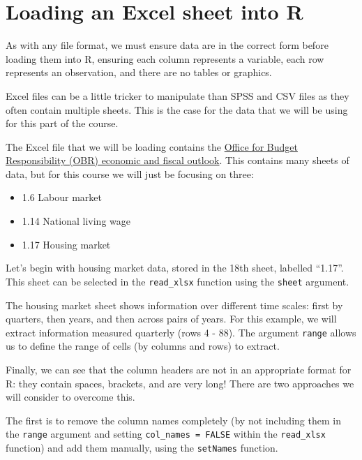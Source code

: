 \documentclass[
  letterpaper,
  DIV=11,
  numbers=noendperiod]{scrreprt}
\providecommand{\tightlist}{%
  \setlength{\itemsep}{0pt}\setlength{\parskip}{0pt}}\usepackage{longtable,booktabs,array}
\begin{document}
\section{Loading an Excel sheet into
R}\label{loading-an-excel-sheet-into-r}

As with any file format, we must ensure data are in the correct form
before loading them into R, ensuring each column represents a variable,
each row represents an observation, and there are no tables or graphics.

Excel files can be a little tricker to manipulate than SPSS and CSV
files as they often contain multiple sheets. This is the case for the
data that we will be using for this part of the course.

The Excel file that we will be loading contains the
\href{https://view.officeapps.live.com/op/view.aspx?src=https\%3A\%2F\%2Fobr.uk\%2Fdocs\%2Fdlm_uploads\%2FDetailed_forecast_tables_Economy_March_2024.xlsx&wdOrigin=BROWSELINK}{Office
for Budget Responsibility (OBR) economic and fiscal outlook}. This
contains many sheets of data, but for this course we will just be
focusing on three:

\begin{itemize}
\tightlist
\item
  1.6 Labour market
\item
  1.14 National living wage
\item
  1.17 Housing market
\end{itemize}

Let's begin with housing market data, stored in the 18th sheet, labelled
``1.17''. This sheet can be selected in the \texttt{read\_xlsx} function
using the \texttt{sheet} argument.

The housing market sheet shows information over different time scales:
first by quarters, then years, and then across pairs of years. For this
example, we will extract information measured quarterly (rows 4 - 88).
The argument \texttt{range} allows us to define the range of cells (by
columns and rows) to extract.

Finally, we can see that the column headers are not in an appropriate
format for R: they contain spaces, brackets, and are very long! There
are two approaches we will consider to overcome this.

The first is to remove the column names completely (by not including
them in the \texttt{range} argument and setting
\texttt{col\_names\ =\ FALSE} within the \texttt{read\_xlsx} function)
and add them manually, using the \texttt{setNames} function.
\end{document}

